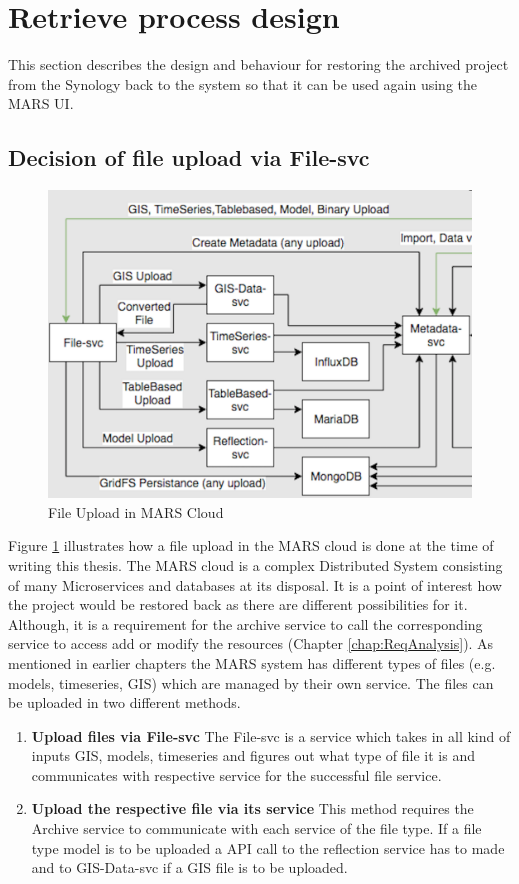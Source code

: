 \section{Retrieve process design}
This section describes the design and behaviour for restoring the archived project from the Synology back to the system
so that it can be used again using the MARS UI.   

\subsection{Decision of file upload via File-svc}

\begin{figure}[H]
    \centering \includegraphics[scale=0.6]{grafiken/mars-cloud.png}
    \caption{File Upload in MARS Cloud \cite{MARSCLoud}}
    \label{fig:MARSCloud}
\end{figure}

Figure \ref{fig:MARSCloud} illustrates how a file upload in the MARS cloud is done at the time of writing this thesis. 
The MARS cloud is a complex Distributed System consisting of many 
Microservices and databases at its disposal. It is a point of interest how the project would be restored back as there are different possibilities for it. 
Although, it is a requirement for the archive service
to call the corresponding service to access add or modify the resources (Chapter \ref{chap:ReqAnalysis}). As mentioned in earlier chapters the MARS system
has different types of files (e.g. models, timeseries, GIS) which are managed by their own service. The files can be uploaded in two different methods.
\begin{enumerate}
 \item \textbf{Upload files via File-svc} The File-svc is a service which takes in all kind of inputs GIS, models, timeseries and figures out what type of
    file it is and communicates with respective service for the successful file service. 
 \item \textbf{Upload the respective file via its service} This method requires the Archive service to communicate with each service of the file type. If a file type
 model is to be uploaded a API call to the reflection service has to made and to GIS-Data-svc if a GIS file is to be uploaded.
\end{enumerate} 

